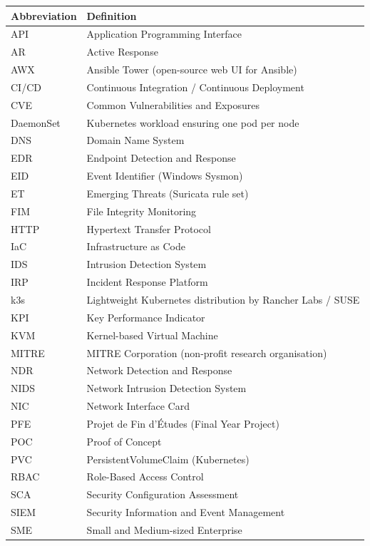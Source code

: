 \documentclass[12pt,a4paper]{report}
\begin{document}
\begin{longtable}{p{3cm}p{10cm}}
\toprule
\textbf{Abbreviation} & \textbf{Definition} \\
\midrule
\endhead
API    & Application Programming Interface \\
AR     & Active Response \\
AWX    & Ansible Tower (open-source web UI for Ansible) \\
CI/CD  & Continuous Integration / Continuous Deployment \\
CVE    & Common Vulnerabilities and Exposures \\
DaemonSet & Kubernetes workload ensuring one pod per node \\
DNS    & Domain Name System \\
EDR    & Endpoint Detection and Response \\
EID    & Event Identifier (Windows Sysmon) \\
ET     & Emerging Threats (Suricata rule set) \\
FIM    & File Integrity Monitoring \\
HTTP   & Hypertext Transfer Protocol \\
IaC    & Infrastructure as Code \\
IDS    & Intrusion Detection System \\
IRP    & Incident Response Platform \\
k3s    & Lightweight Kubernetes distribution by Rancher Labs / SUSE \\
KPI    & Key Performance Indicator \\
KVM    & Kernel-based Virtual Machine \\
MITRE  & MITRE Corporation (non-profit research organisation) \\
NDR    & Network Detection and Response \\
NIDS   & Network Intrusion Detection System \\
NIC    & Network Interface Card \\
PFE    & Projet de Fin d'Études (Final Year Project) \\
POC    & Proof of Concept \\
PVC    & PersistentVolumeClaim (Kubernetes) \\
RBAC   & Role-Based Access Control \\
SCA    & Security Configuration Assessment \\
SIEM   & Security Information and Event Management \\
SME    & Small and Medium-sized Enterprise \\

\end{longtable}
\end{document}
